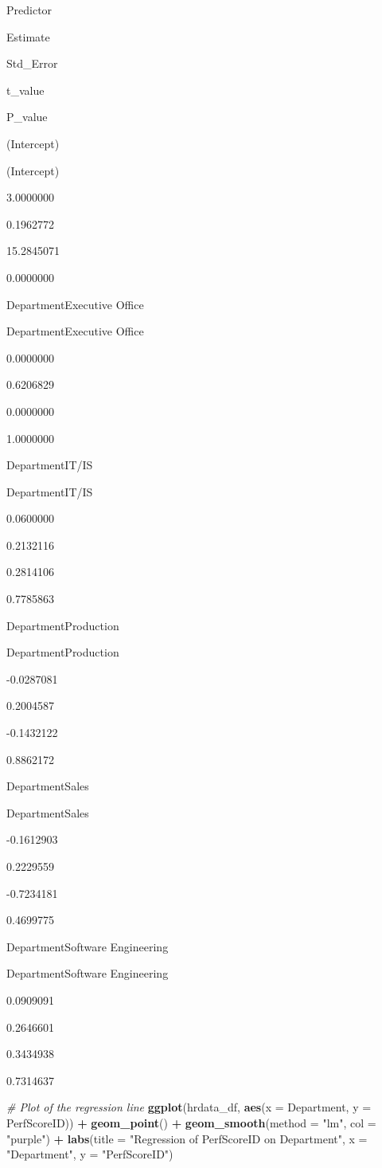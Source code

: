\documentclass[
]{article}
\newenvironment{Shaded}{\begin{snugshade}}{\end{snugshade}}
\newcommand{\AttributeTok}[1]{\textcolor[rgb]{0.13,0.29,0.53}{#1}}
\newcommand{\CommentTok}[1]{\textcolor[rgb]{0.56,0.35,0.01}{\textit{#1}}}
\newcommand{\FunctionTok}[1]{\textcolor[rgb]{0.13,0.29,0.53}{\textbf{#1}}}
\newcommand{\NormalTok}[1]{#1}
\newcommand{\SpecialCharTok}[1]{\textcolor[rgb]{0.81,0.36,0.00}{\textbf{#1}}}
\newcommand{\StringTok}[1]{\textcolor[rgb]{0.31,0.60,0.02}{#1}}
\begin{document}
Predictor

Estimate

Std\_Error

t\_value

P\_value

(Intercept)

(Intercept)

3.0000000

0.1962772

15.2845071

0.0000000

DepartmentExecutive Office

DepartmentExecutive Office

0.0000000

0.6206829

0.0000000

1.0000000

DepartmentIT/IS

DepartmentIT/IS

0.0600000

0.2132116

0.2814106

0.7785863

DepartmentProduction

DepartmentProduction

-0.0287081

0.2004587

-0.1432122

0.8862172

DepartmentSales

DepartmentSales

-0.1612903

0.2229559

-0.7234181

0.4699775

DepartmentSoftware Engineering

DepartmentSoftware Engineering

0.0909091

0.2646601

0.3434938

0.7314637

\begin{Shaded}
\begin{Highlighting}[]
\CommentTok{\# Plot of the regression line}
\FunctionTok{ggplot}\NormalTok{(hrdata\_df, }\FunctionTok{aes}\NormalTok{(}\AttributeTok{x =}\NormalTok{ Department, }\AttributeTok{y =}\NormalTok{ PerfScoreID)) }\SpecialCharTok{+}
  \FunctionTok{geom\_point}\NormalTok{() }\SpecialCharTok{+}
  \FunctionTok{geom\_smooth}\NormalTok{(}\AttributeTok{method =} \StringTok{"lm"}\NormalTok{, }\AttributeTok{col =} \StringTok{"purple"}\NormalTok{) }\SpecialCharTok{+}
  \FunctionTok{labs}\NormalTok{(}\AttributeTok{title =} \StringTok{"Regression of PerfScoreID on Department"}\NormalTok{,}
       \AttributeTok{x =} \StringTok{"Department"}\NormalTok{,}
       \AttributeTok{y =} \StringTok{"PerfScoreID"}\NormalTok{)}
\end{Highlighting}
\end{Shaded}
\end{document}
